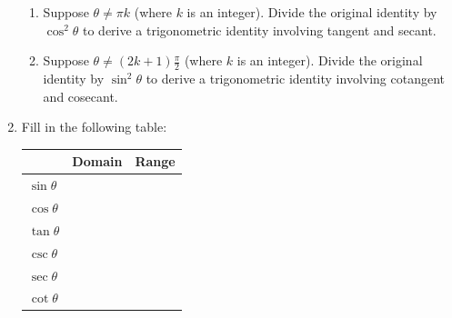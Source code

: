 \documentclass[12pt]{article}
\newif\ifans
\begin{document}
\begin{enumerate}
\begin{enumerate}

\item Suppose $\theta\neq\pi k$ (where $k$ is an integer).  Divide the original identity by $\cos^2\theta$ to derive a trigonometric identity involving tangent and secant.

\ifans\fbox{\parbox{1\linewidth}{Suppose $\theta\neq\pi k$ (where $k$ is an integer).  Then, it follows that $\cos{\theta}\neq 0$ and we may divide by $\cos{\theta}$.
\begin{align*}
\cos^2\theta+\sin^2\theta&=1\\
\frac{\cos^2\theta+\sin^2\theta}{\cos^2\theta} &=\frac{1}{\cos^2\theta} && \text{Divide both sides by $\cos^2\theta$}\\
1+\left(\frac{\sin\theta}{\cos\theta}\right)^2&=\left(\frac{1}{\cos\theta}\right)^2 && \\
1+\tan^2\theta&=\sec^2\theta && \text{By definition of tangent and secant}
\end{align*}
Thus, $1+\tan^2\theta=\sec^2\theta$.
}} \fi

\item Suppose $\theta\neq(2k+1)\frac{\pi}{2}$ (where $k$ is an integer).  Divide the original identity by $\sin^2\theta$ to derive a trigonometric identity involving cotangent and cosecant.

\ifans\fbox{$\cot^2\theta+1=\csc^2\theta$} \fi

\end{enumerate}

\newpage

\item Fill in the following table:
\begin{center}
\begin{tabular}{l|c|c}
& Domain & Range\\
\hline
$\sin{\theta}$ & &\\
\hline
$\cos{\theta}$ & &\\
\hline
$\tan{\theta}$ & &\\
\hline
$\csc{\theta}$ & &\\
\hline
$\sec{\theta}$ & &\\
\hline
$\cot{\theta}$ & &
\end{tabular}
\end{center}


\end{enumerate}
\end{document}
